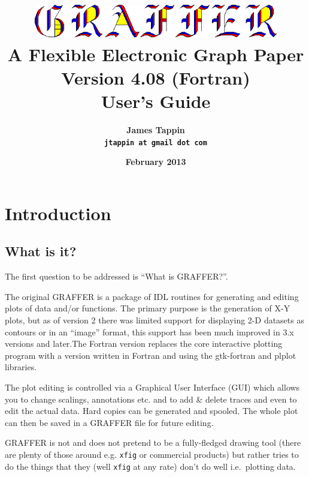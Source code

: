 \documentclass[11pt,twoside,english]{article}
\begin{document}
\title{\includegraphics[width=0.80\textwidth]{logo} \\
  A Flexible Electronic Graph Paper\\
  Version 4.08 (Fortran)\\
  User's Guide}

\author{\textsf{\textbf{\Large James Tappin}}\\
  \texttt{\textbf{\Large jtappin at gmail dot com}}}

\date{\textsf{\textbf{\large February 2013}}}

\maketitle

\begin{multicols}{2}
  \tableofcontents{}
\end{multicols}

\section{Introduction}


\subsection{What is it?}

The first question to be addressed is {}``What is GRAFFER?''.

The original GRAFFER is a package of IDL routines for generating and
editing plots of data and/or functions. The primary purpose is the
generation of X-Y plots, but as of version 2 there was limited support
for displaying 2-D datasets as contours or in an {}``image'' format,
this support has been much improved in 3.x versions and later.The
Fortran version replaces the core interactive plotting program with a
version written in Fortran and using the gtk-fortran and plplot
libraries. 

The plot editing is controlled via a Graphical User Interface (GUI)
which allows you to change scalings, annotations etc. and to add \&
delete traces and even to edit the actual data. Hard copies can be
generated and spooled. The whole plot can then be saved in a GRAFFER
file for future editing.

GRAFFER is not and does not pretend to be a fully-fledged drawing tool
(there are plenty of those around e.g. \texttt{xfig} or commercial
products) but rather tries to do the things that they (well
\texttt{xfig} at any rate) don't do well i.e.\ plotting data.
\end{document}

